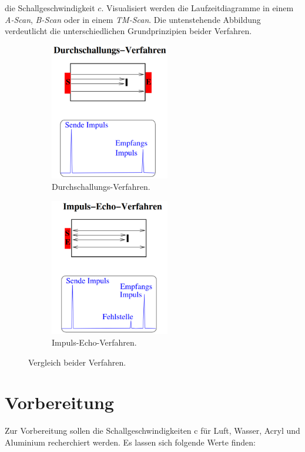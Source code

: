\noindent die Schallgeschwindigkeit $c$. Visualisiert werden die Laufzeitdiagramme in einem \emph{A-Scan}, \emph{B-Scan} oder in 
einem \emph{TM-Scan}. Die untenstehende Abbildung verdeutlicht die unterschiedlichen Grundprinzipien beider Verfahren.

\begin{figure}
    \begin{subfigure}{0.48\textwidth}
        \centering
        \includegraphics[height=6cm]{Durchschallung.png}
        \caption{Durchschallungs-Verfahren.}
        \label{fig:DSV}
    \end{subfigure}
    \hfill
    \begin{subfigure}{0.48\textwidth}
        \centering 
        \includegraphics[height=6cm]{Impuls_Echo.png}
        \caption{Impuls-Echo-Verfahren.}
        \label{fig:IEV}
    \end{subfigure}
    \caption{Vergleich beider Verfahren.}
    \label{fig:Vergleich}
\end{figure}

\section{Vorbereitung}
Zur Vorbereitung sollen die Schallgeschwindigkeiten c für Luft, Wasser, Acryl und Aluminium recherchiert werden. Es 
lassen sich folgende Werte finden:

